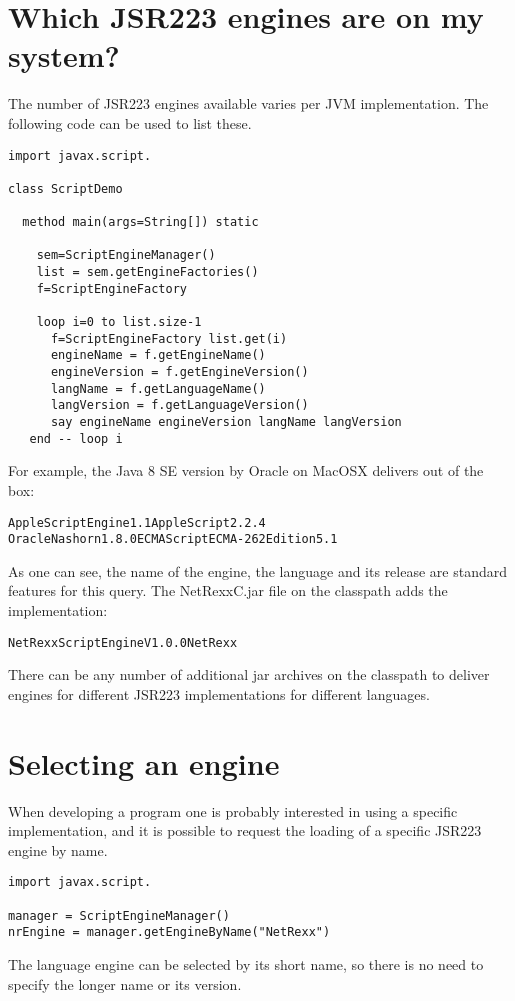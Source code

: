 \section{Which JSR223 engines are on my system?}
The number of JSR223 engines available varies per JVM implementation. The following code can be used to list these.
\begin{lstlisting}[label=enumeratejsr223,caption=Enumerate the JSR223 Engines on a JVM]
import javax.script.

class ScriptDemo
  
  method main(args=String[]) static
    
    sem=ScriptEngineManager()
    list = sem.getEngineFactories()
    f=ScriptEngineFactory
    
    loop i=0 to list.size-1
      f=ScriptEngineFactory list.get(i)
      engineName = f.getEngineName()
      engineVersion = f.getEngineVersion()
      langName = f.getLanguageName()
      langVersion = f.getLanguageVersion()
      say engineName engineVersion langName langVersion
   end -- loop i

\end{lstlisting}
For example, the Java 8 SE version by Oracle on MacOSX delivers out of the box:
\begin{alltt}
AppleScriptEngine 1.1 AppleScript 2.2.4
Oracle Nashorn 1.8.0  ECMAScript ECMA - 262 Edition 5.1
\end{alltt}
As one can see, the name of the engine, the language and its release are standard features for this query. The NetRexxC.jar file on the classpath adds the \nr{} implementation:
\begin{alltt}
NetRexx Script Engine V1.0.0 NetRexx \nrversion{}
\end{alltt}
There can be any number of additional jar archives on the classpath to deliver engines for different JSR223 implementations for different languages.
\section{Selecting an engine}
When developing a program one is probably interested in using a specific implementation, and it is possible to request the loading of a specific JSR223 engine by name.
\begin{lstlisting}[label=choosingjsr223,caption=Choosing an engine]
import javax.script.

manager = ScriptEngineManager()
nrEngine = manager.getEngineByName("NetRexx")
\end{lstlisting}
The language engine can be selected by its short name, so there is no need to specify the longer name or its version.
